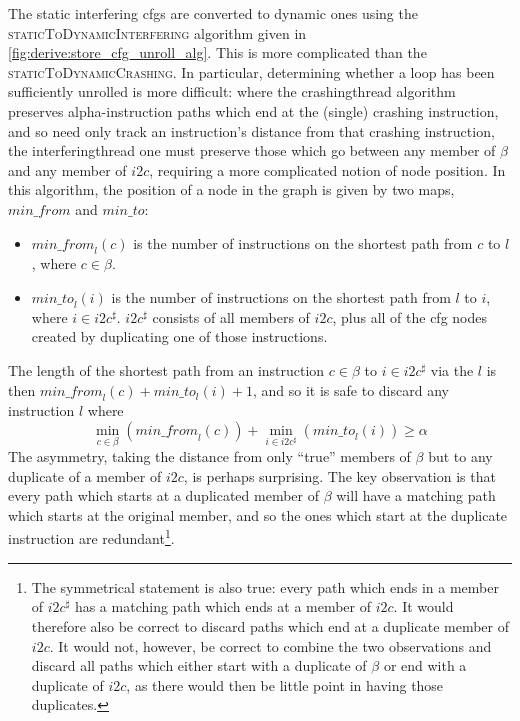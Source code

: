 The static interfering \glspl{cfg} are converted to dynamic ones using
the \textsc{staticToDynamicInterfering} algorithm given in
\autoref{fig:derive:store_cfg_unroll_alg}.  This is more complicated
than the \textsc{staticToDynamicCrashing}.  In particular, determining
whether a loop has been sufficiently unrolled is more difficult: where
the \gls{crashingthread} algorithm preserves \gls{alpha}-instruction
paths which end at the (single) \gls{crashing instruction}, and so
need only track an instruction's distance from that \gls{crashing
  instruction}, the \gls{interferingthread} one must preserve those
which go between any member of $\beta$ and any member of $i2c$,
requiring a more complicated notion of node position.  In this
algorithm, the position of a node in the graph is given by two maps,
$\mathit{min\_from}$ and $\mathit{min\_to}$:
\begin{itemize}
\item
  $\mathit{min\_from}_l(c)$ is the number of instructions on the
  shortest path from $c$ to $l$, where $c \in \beta$.
\item
  $\mathit{min\_to}_l(i)$ is the number of instructions on the
  shortest path from $l$ to $i$, where $i \in i2c^\sharp$.
  $i2c^\sharp$ consists of all members of $i2c$, plus all of the
  \gls{cfg} nodes created by duplicating one of those instructions.
\end{itemize}
The length of the shortest path from an instruction $c
\in \beta$ to $i \in i2c^\sharp$ via the $l$ is then
$\mathit{min\_from}_l(c) + \mathit{min\_to}_l(i) + 1$, and so it is safe
to discard any instruction $l$ where
\begin{displaymath}
\min_{c \in \beta}\left(\mathit{min\_from}_l(c)\right) + \min_{i \in i2c^\sharp}\left(\mathit{min\_to}_l(i)\right) {\geq} \alpha
\end{displaymath}
The asymmetry, taking the distance from only ``true'' members of
$\beta$ but to any duplicate of a member of $i2c$, is perhaps
surprising.  The key observation is that every path which starts at a
duplicated member of $\beta$ will have a matching path which starts at
the original member, and so the ones which start at the duplicate
instruction are redundant\footnote{The symmetrical statement is also
  true: every path which ends in a member of $i2c^\sharp$ has a
  matching path which ends at a member of $i2c$.  It would therefore
  also be correct to discard paths which end at a duplicate member of
  $i2c$.  It would not, however, be correct to combine the two
  observations and discard all paths which either start with a
  duplicate of $\beta$ or end with a duplicate of $i2c$, as there
  would then be little point in having those duplicates.}.

